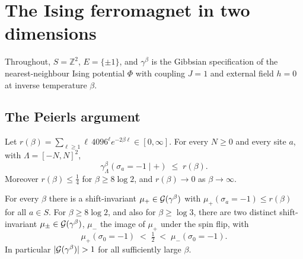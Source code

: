 \section{The Ising ferromagnet in two dimensions}

Throughout, $S = \mathbb{Z}^2$, $E = \{\pm 1\}$, and $\gamma^{\beta}$ is the Gibbsian specification
of the nearest-neighbour Ising potential $\Phi$ with coupling $J = 1$ and external field $h = 0$ at
inverse temperature $\beta$.

\subsection*{The Peierls argument}

\begin{lemma}
    \label{lem:ising-peierls}
    \leanok

    Let $r(\beta) = \sum_{\ell \geq 1} \ell\, 4096^{\ell} e^{-2\beta\ell} \in [0,\infty]$. For
    every $N \geq 0$ and every site $a$, with $\Lambda = [-N,N]^2$,
    \[\gamma^{\beta}_{\Lambda}(\sigma_a = -1 \mid +) \;\leq\; r(\beta).\]
    Moreover $r(\beta) \leq \tfrac14$ for $\beta \geq 8\log 2$, and $r(\beta) \to 0$ as
    $\beta \to \infty$.
\end{lemma}

\begin{theorem}
    \label{thm:ising-69-two-phases}
    \leanok

    For every $\beta$ there is a shift-invariant $\mu_+ \in \mathcal{G}(\gamma^{\beta})$ with
    $\mu_+(\sigma_a = -1) \leq r(\beta)$ for all $a \in S$. For $\beta \geq 8 \log 2$, and also
    for $\beta \geq \log 3$, there are two distinct shift-invariant
    $\mu_\pm \in \mathcal{G}(\gamma^{\beta})$, $\mu_-$ the image of $\mu_+$ under the spin flip, with
    \[\mu_+(\sigma_0 = -1) \;<\; \tfrac12 \;<\; \mu_-(\sigma_0 = -1).\]
    In particular $|\mathcal{G}(\gamma^{\beta})| > 1$ for all sufficiently large $\beta$.
\end{theorem}

